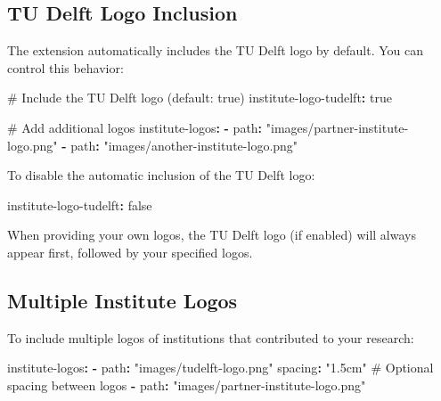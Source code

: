 \documentclass{tudelft}
\newenvironment{Shaded}{\begin{snugshade}}{\end{snugshade}}
\newcommand{\AttributeTok}[1]{\textcolor[rgb]{0.40,0.45,0.13}{#1}}
\newcommand{\CharTok}[1]{\textcolor[rgb]{0.13,0.47,0.30}{#1}}
\newcommand{\CommentTok}[1]{\textcolor[rgb]{0.37,0.37,0.37}{#1}}
\newcommand{\FunctionTok}[1]{\textcolor[rgb]{0.28,0.35,0.67}{#1}}
\newcommand{\KeywordTok}[1]{\textcolor[rgb]{0.00,0.23,0.31}{\textbf{#1}}}
\newcommand{\StringTok}[1]{\textcolor[rgb]{0.13,0.47,0.30}{#1}}
\begin{document}
\subsection{TU Delft Logo Inclusion}\label{tu-delft-logo-inclusion}

The extension automatically includes the TU Delft logo by default. You
can control this behavior:

\begin{Shaded}
\begin{Highlighting}[]
\CommentTok{\# Include the TU Delft logo (default: true)}
\FunctionTok{institute{-}logo{-}tudelft}\KeywordTok{:}\AttributeTok{ }\CharTok{true}\AttributeTok{  }

\CommentTok{\# Add additional logos}
\FunctionTok{institute{-}logos}\KeywordTok{:}
\AttributeTok{  }\KeywordTok{{-}}\AttributeTok{ }\FunctionTok{path}\KeywordTok{:}\AttributeTok{ }\StringTok{"images/partner{-}institute{-}logo.png"}
\AttributeTok{  }\KeywordTok{{-}}\AttributeTok{ }\FunctionTok{path}\KeywordTok{:}\AttributeTok{ }\StringTok{"images/another{-}institute{-}logo.png"}
\end{Highlighting}
\end{Shaded}

To disable the automatic inclusion of the TU Delft logo:

\begin{Shaded}
\begin{Highlighting}[]
\FunctionTok{institute{-}logo{-}tudelft}\KeywordTok{:}\AttributeTok{ }\CharTok{false}
\end{Highlighting}
\end{Shaded}

When providing your own logos, the TU Delft logo (if enabled) will
always appear first, followed by your specified logos.

\subsection{Multiple Institute Logos}\label{multiple-institute-logos}

To include multiple logos of institutions that contributed to your
research:

\begin{Shaded}
\begin{Highlighting}[]
\FunctionTok{institute{-}logos}\KeywordTok{:}
\AttributeTok{  }\KeywordTok{{-}}\AttributeTok{ }\FunctionTok{path}\KeywordTok{:}\AttributeTok{ }\StringTok{"images/tudelft{-}logo.png"}
\AttributeTok{    }\FunctionTok{spacing}\KeywordTok{:}\AttributeTok{ }\StringTok{"1.5cm"}\CommentTok{  \# Optional spacing between logos}
\AttributeTok{  }\KeywordTok{{-}}\AttributeTok{ }\FunctionTok{path}\KeywordTok{:}\AttributeTok{ }\StringTok{"images/partner{-}institute{-}logo.png"}
\end{Highlighting}
\end{Shaded}
\end{document}
